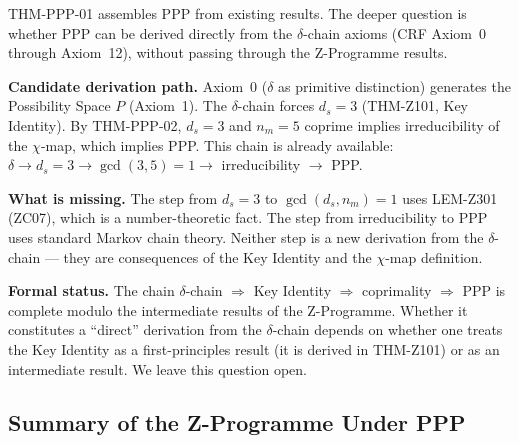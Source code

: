 \documentclass[12pt, a4paper]{article}
\begin{document}
\begin{openqbox}[title={GAP-PPP-01: Deriving PPP from the $\delta$-chain}]
THM-PPP-01 assembles PPP from existing results. The deeper question
is whether PPP can be derived directly from the $\delta$-chain
axioms (CRF Axiom~0 through Axiom~12), without passing through
the Z-Programme results.

\textbf{Candidate derivation path.}
Axiom~0 ($\delta$ as primitive distinction) generates the
Possibility Space $P$ (Axiom~1). The $\delta$-chain forces
$d_s = 3$ (THM-Z101, Key Identity). By THM-PPP-02, $d_s = 3$
and $n_m = 5$ coprime implies irreducibility of the $\chi$-map,
which implies PPP. This chain is already available:
$\delta \to d_s = 3 \to \gcd(3,5) = 1 \to$ irreducibility
$\to$ PPP.

\textbf{What is missing.} The step from $d_s = 3$ to
$\gcd(d_s, n_m) = 1$ uses LEM-Z301 (ZC07), which is a
number-theoretic fact. The step from irreducibility to PPP
uses standard Markov chain theory. Neither step is a new
derivation from the $\delta$-chain --- they are consequences
of the Key Identity and the $\chi$-map definition.

\textbf{Formal status.} The chain $\delta$-chain $\Rightarrow$
Key Identity $\Rightarrow$ coprimality $\Rightarrow$ PPP is
complete modulo the intermediate results of the Z-Programme.
Whether it constitutes a ``direct'' derivation from the
$\delta$-chain depends on whether one treats the Key Identity
as a first-principles result (it is derived in THM-Z101) or
as an intermediate result. We leave this question open.
\end{openqbox}

\subsection{Summary of the Z-Programme Under PPP}
\label{sec:status}
\end{document}
